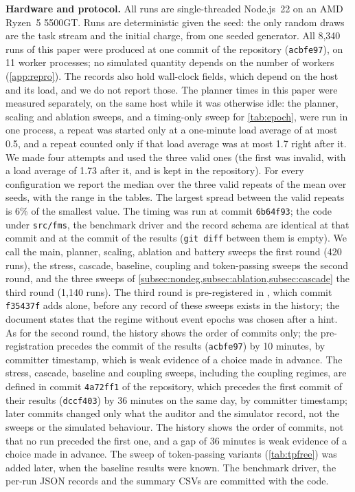 \noindent\textbf{Hardware and protocol.}
All runs are single-threaded Node.js~22 on an AMD Ryzen~5 5500GT. Runs are
deterministic given the seed: the only random draws are the task stream and
the initial charge, from one seeded generator. All 8{,}340 runs of this
paper were produced at one commit of the repository (\texttt{acbfe97}), on 11
worker processes; no simulated quantity depends on the number of workers
(\cref{app:repro}). The records also hold wall-clock fields, which depend on
the host and its load, and we do not report those. The planner times in this
paper were measured separately, on the same host while it was otherwise
idle: the planner, scaling and ablation sweeps, and a timing-only sweep for \cref{tab:epoch}, were run in one process, a
repeat was started only at a one-minute load average of at most 0.5, and a
repeat counted only if that load average was at most 1.7 right after it.
We made four attempts and used the three valid ones (the first was
invalid, with a load average of 1.73 after it, and is kept in the
repository). For every configuration we report the median over the three
valid repeats of the mean over seeds, with the range in the tables. The
largest spread between the valid repeats is 6\% of the smallest value.
The timing was run at commit \texttt{6b64f93}; the code under
\texttt{src/fms}, the benchmark driver and the record schema are identical at
that commit and at the commit of the results (\texttt{git diff} between them
is empty). We call the main, planner, scaling, ablation and battery
sweeps the first round (420 runs), the stress, cascade, baseline, coupling and
token-passing sweeps the second round, and the three sweeps of
\cref{subsec:nondeg,subsec:ablation,subsec:cascade} the third round
(1{,}140 runs). The third round is pre-registered in
, which commit \texttt{f35437f} adds
alone, before any record of these sweeps exists in the history; the
document states that the regime without event epochs was chosen after a
hint. As for the second round, the history shows the order of commits only; the
pre-registration precedes the commit of the results (\texttt{acbfe97}) by 10 minutes, by committer
timestamp, which is weak evidence of a choice made in advance. The
stress, cascade, baseline and coupling sweeps, including the coupling
regimes, are defined in commit \texttt{4a72ff1} of the repository, which
precedes the first commit of their results (\texttt{dccf403}) by 36 minutes
on the same day, by committer timestamp; later commits changed only what the
auditor and the simulator record, not the sweeps or the simulated behaviour.
The history shows the order of commits, not that no run preceded the first
one, and a gap of 36 minutes is weak evidence of a choice made in advance.
The sweep of token-passing variants (\cref{tab:tpfree}) was added later,
when the baseline results were known. The benchmark
driver, the per-run JSON records and the summary CSVs are committed with the
code.

